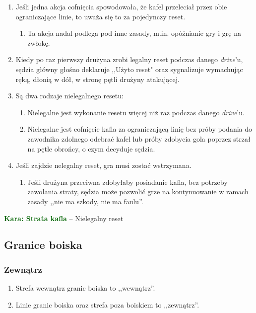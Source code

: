 \documentclass[11pt,a4paper]{article}
\newcommand\penaltyd[2]{\bgroup\textcolor{darkgreen}{\textbf{Kara: #1}} -- #2}
\begin{document}
\begin{enumerate}
\begin{enumerate}
\begin{enumerate}
    \end{enumerate}
  \end{enumerate}
  \item Jeśli jedna akcja cofnięcia spowodowała, że kafel przeleciał przez obie ograniczające linie, to uważa się to za pojedynczy reset.
  \begin{enumerate}
    \item Ta akcja nadal podlega pod inne zasady, m.in. opóźnianie gry i grę na zwłokę.
  \end{enumerate}
  \item Kiedy po raz pierwszy drużyna zrobi legalny reset podczas danego \emph{drive}'u, sędzia główny głośno deklaruje ,,Użyto reset" oraz sygnalizuje wymachując ręką, dłonią w dół, w stronę pętli drużyny atakującej. %
  \item Są dwa rodzaje nielegalnego resetu:
  \begin{enumerate}
    \item Nielegalne jest wykonanie resetu więcej niż raz podczas danego \emph{drive}'u.
    \item Nielegalne jest cofnięcie kafla za ograniczającą linię bez próby podania do zawodnika zdolnego odebrać kafel lub próby zdobycia gola poprzez strzał na pętle obrońcy, o czym decyduje sędzia.
  \end{enumerate}
  \item Jeśli zajdzie nelegalny reset, gra musi zostać wstrzymana.
  \begin{enumerate}
    \item Jeśli drużyna przeciwna zdobyłaby posiadanie kafla, bez potrzeby zawołania straty, sędzia może pozwolić grze na kontynuowanie w ramach zasady ,,nie ma szkody, nie ma faulu''.
  \end{enumerate}
\end{enumerate}

\penaltyd{Strata kafla}{Nielegalny reset}

\subsection{Granice boiska}

\subsubsection{Zewnątrz}
\begin{enumerate}
  \item Strefa wewnątrz granic boiska to ,,wewnątrz''.
  \item Linie granic boiska oraz strefa poza boiskiem to ,,zewnątrz''.
\end{enumerate}
\end{document}
